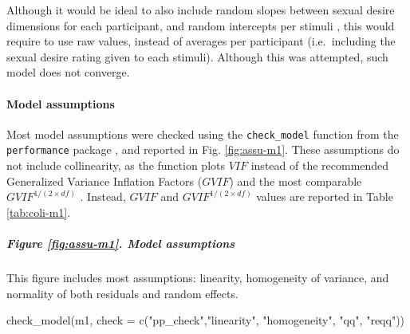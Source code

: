 \documentclass[
  bookmarksnumbered]{article}
\newenvironment{Shaded}{\begin{snugshade}}{\end{snugshade}}
\newcommand{\AttributeTok}[1]{\textcolor[rgb]{0.80,0.80,0.80}{#1}}
\newcommand{\FunctionTok}[1]{\textcolor[rgb]{0.94,0.94,0.56}{#1}}
\newcommand{\NormalTok}[1]{\textcolor[rgb]{0.80,0.80,0.80}{#1}}
\newcommand{\StringTok}[1]{\textcolor[rgb]{0.80,0.58,0.58}{#1}}
\begin{document}
Although it would be ideal to also include random slopes between sexual desire dimensions for each participant, and random intercepts per stimuli \autocites{barr2013}[see also][]{debruine2021}, this would require to use raw values, instead of averages per participant (i.e.~including the sexual desire rating given to each stimuli). Although this was attempted, such model does not converge.

\hypertarget{model-assumptions}{%
\paragraph{Model assumptions}\label{model-assumptions}}

Most model assumptions were checked using the \texttt{check\_model} function from the \texttt{performance} package \autocite{ludecke2021}, and reported in Fig. \ref{fig:assu-m1}. These assumptions do not include collinearity, as the function plots \(VIF\) instead of the recommended Generalized Variance Inflation Factors (\(GVIF\)) and the most comparable \(GVIF^{{1}/{(2 \times df)}}\) \autocite{fox1992}. Instead, \(GVIF\) and \(GVIF^{{1}/{(2 \times df)}}\) values are reported in Table \ref{tab:coli-m1}.

\hypertarget{figure-reffigassu-m1.-model-assumptions}{%
\subparagraph{Figure \ref{fig:assu-m1}. Model assumptions}\label{figure-reffigassu-m1.-model-assumptions}}

This figure includes most assumptions: linearity, homogeneity of variance, and normality of both residuals and random effects.

\begin{Shaded}
\begin{Highlighting}[]
\FunctionTok{check\_model}\NormalTok{(m1,}
            \AttributeTok{check =} \FunctionTok{c}\NormalTok{(}\StringTok{"pp\_check"}\NormalTok{,}\StringTok{"linearity"}\NormalTok{, }\StringTok{"homogeneity"}\NormalTok{, }\StringTok{"qq"}\NormalTok{, }\StringTok{"reqq"}\NormalTok{))}
\end{Highlighting}
\end{Shaded}
\end{document}
